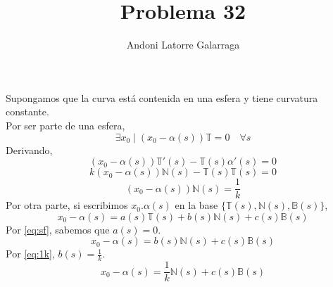 \documentclass{article}
\title{Problema 32}
\author{Andoni Latorre Galarraga}
\date{}
\newcommand{\bb}[1]{\mathbb{#1}}
\begin{document}
\setlength{\parindent}{0cm}
\maketitle
Supongamos que la curva está contenida en una esfera y tiene curvatura constante.\\
Por ser parte de una esfera,
\begin{equation}\label{eq:sf}
\exists x_0 \mid (x_0-\alpha(s))\bb{T}=0 \quad \forall s
\end{equation}
Derivando,
$$
(x_0-\alpha(s))\bb{T}'(s)-\bb{T}(s)\alpha'(s)=0
$$
$$
k(x_0-\alpha(s))\bb{N}(s)-\bb{T}(s)\bb{T}(s)=0
$$
\begin{equation}\label{eq:1k}
(x_0-\alpha(s))\bb{N}(s)=\frac{1}{k}
\end{equation}
Por otra parte, si escribimos $x_0.\alpha(s)$ en la base $\{\bb{T}(s),\bb{N}(s),\bb{B}(s)\}$,
$$
x_0-\alpha(s)=a(s)\bb{T}(s)+b(s)\bb{N}(s)+c(s)\bb{B}(s)
$$
Por \eqref{eq:sf}, sabemos que $a(s)=0$.
$$
x_0-\alpha(s)=b(s)\bb{N}(s)+c(s)\bb{B}(s)
$$
Por \eqref{eq:1k}, $b(s)=\frac{1}{k}$.
$$
x_0-\alpha(s)=\frac{1}{k}\bb{N}(s)+c(s)\bb{B}(s)
$$
\end{document}
